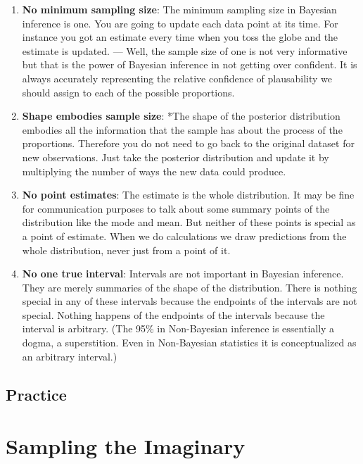 \documentclass[
  letterpaper,
  DIV=11,
  numbers=noendperiod]{scrreprt}
\providecommand{\tightlist}{%
  \setlength{\itemsep}{0pt}\setlength{\parskip}{0pt}}\usepackage{longtable,booktabs,array}
\begin{document}
\begin{enumerate}
\def\labelenumi{\arabic{enumi}.}
\tightlist
\item
  \textbf{No minimum sampling size}: The minimum sampling size in
  Bayesian inference is one. You are going to update each data point at
  its time. For instance you got an estimate every time when you toss
  the globe and the estimate is updated. --- Well, the sample size of
  one is not very informative but that is the power of Bayesian
  inference in not getting over confident. It is always accurately
  representing the relative confidence of plausability we should assign
  to each of the possible proportions.
\item
  \textbf{Shape embodies sample size}: *The shape of the posterior
  distribution embodies all the information that the sample has about
  the process of the proportions. Therefore you do not need to go back
  to the original dataset for new observations. Just take the posterior
  distribution and update it by multiplying the number of ways the new
  data could produce.
\item
  \textbf{No point estimates}: The estimate is the whole distribution.
  It may be fine for communication purposes to talk about some summary
  points of the distribution like the mode and mean. But neither of
  these points is special as a point of estimate. When we do
  calculations we draw predictions from the whole distribution, never
  just from a point of it.
\item
  \textbf{No one true interval}: Intervals are not important in Bayesian
  inference. They are merely summaries of the shape of the distribution.
  There is nothing special in any of these intervals because the
  endpoints of the intervals are not special. Nothing happens of the
  endpoints of the intervals because the interval is arbitrary. (The
  95\% in Non-Bayesian inference is essentially a dogma, a superstition.
  Even in Non-Bayesian statistics it is conceptualized as an arbitrary
  interval.)
\end{enumerate}

\hypertarget{practice}{%
\section{Practice}\label{practice}}


\hypertarget{sec-sampling-the-imaginary}{%
\chapter{Sampling the Imaginary}\label{sec-sampling-the-imaginary}}
\end{document}
